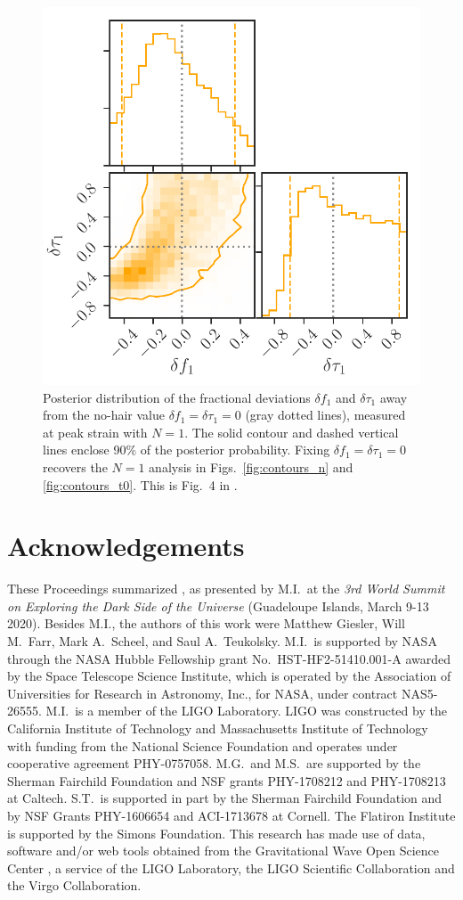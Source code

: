 \documentclass[letterpaper]{article}
\begin{document}
\begin{figure}[bt]
\centering
\includegraphics[width=0.66\columnwidth,clip=true]{delta_ftau1}
\caption{
Posterior distribution of the fractional deviations $\delta f_1$ and $\delta\tau_1$ away from the no-hair value $\delta f_1=\delta\tau_1=0$ (gray dotted lines), measured at peak strain with $N=1$.
The solid contour and dashed vertical lines enclose 90\% of the posterior probability.
Fixing $\delta f_1=\delta\tau_1 = 0$ recovers the $N=1$ analysis in Figs.~\ref{fig:contours_n} and \ref{fig:contours_t0}.
This is Fig.~4 in \cite{Isi:2019aib}.
}
\label{fig:deltaf1}
\end{figure}


\section*{Acknowledgements}
These Proceedings summarized \cite{Isi:2019aib}, as presented by M.I.~at the \emph{3rd World Summit on Exploring the Dark Side of the Universe} (Guadeloupe Islands, March 9-13 2020).
Besides M.I., the authors of this work were Matthew Giesler, Will M.~Farr, Mark A.~Scheel, and Saul A.~Teukolsky.
M.I.\ is supported by NASA through the NASA Hubble Fellowship
grant No.\ HST-HF2-51410.001-A awarded by the Space Telescope
Science Institute, which is operated by the Association of Universities
for Research in Astronomy, Inc., for NASA, under contract NAS5-26555.
M.I.\ is a member of the LIGO Laboratory.
LIGO was constructed by the California Institute of Technology and
Massachusetts Institute of Technology with funding from the National
Science Foundation and operates under cooperative agreement PHY-0757058.
M.G.\ and M.S.\ are supported by the Sherman Fairchild Foundation and NSF
grants PHY-1708212 and PHY-1708213 at Caltech.
S.T.\ is supported in part by the Sherman Fairchild Foundation and by NSF Grants
PHY-1606654 and ACI-1713678 at Cornell.
The Flatiron Institute is supported by the Simons Foundation.
This research has made use of data, software and/or web tools obtained from the Gravitational Wave Open Science Center \cite{Vallisneri:2014vxa,gwosc}, a service of the LIGO Laboratory, the LIGO Scientific Collaboration and the Virgo Collaboration.

 


\end{document}
